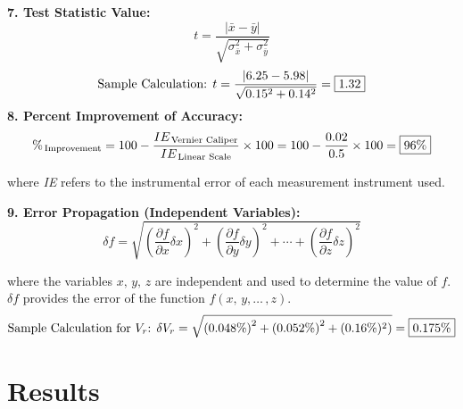 \documentclass[12pt]{article}
\begin{document}
\textbf{7. Test Statistic Value:}
\[t=\frac{\left|\bar{x}-\bar{y}\right|}{\sqrt{\sigma^2_{\bar{x}}+\sigma^2_{\bar{y}}}}\]
\[\textnormal{Sample Calculation: }t=\frac{|6.25-5.98|}{\sqrt{0.15^2+0.14^2}}=\boxed{1.32}\]
\textbf{8. Percent Improvement of Accuracy:}\[\%_{\textnormal{\,Improvement}} = 100-\frac{IE_{\textnormal{\,Vernier Caliper}}}{IE_{\textnormal{\,Linear Scale}}}\times 100 = 100- \frac{0.02}{0.5}\times 100 = \boxed{96\%}\]
\begin{center}
    where \textit{IE} refers to the instrumental error of each measurement instrument used.
\end{center}
\textbf{9. Error Propagation (Independent Variables):}
\[\delta f=\sqrt{\left(\frac{\partial f}{\partial x}\delta x\right)^2+\left(\frac{\partial f}{\partial y}\delta y\right)^2+\cdots+\left(\frac{\partial f}{\partial z}\delta z\right)^2}\]
\begin{center}
    where the variables $x,\,y,\,z$ are independent and used to determine the value of $f$. $\delta f$ provides the error of the function $f(x,\,y,\dots\,,z)$.
    \[\textnormal{Sample Calculation for $V_r$: }\delta V_r=\sqrt{\left(0.048\%\right)^2+\left(0.052\%\right)^2+\left(0.16\%)^2\right)}=\boxed{0.175\%} \]
\end{center}
\newpage
\section{Results}


\newpage
\end{document}
